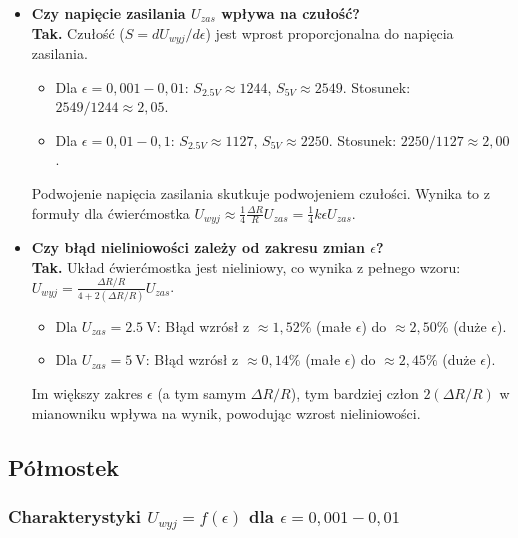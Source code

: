 \documentclass[12pt, a4paper]{article}
\begin{document}
	\begin{itemize}
		\item \textbf{Czy napięcie zasilania $U_{zas}$ wpływa na czułość?} \\
		\textbf{Tak.} Czułość ($S = dU_{wyj}/d\epsilon$) jest wprost proporcjonalna do napięcia zasilania.
		\begin{itemize}
			\item Dla $\epsilon=0,001-0,01$: $S_{2.5V} \approx 1244$, $S_{5V} \approx 2549$. Stosunek: $2549 / 1244 \approx 2,05$.
			\item Dla $\epsilon=0,01-0,1$: $S_{2.5V} \approx 1127$, $S_{5V} \approx 2250$. Stosunek: $2250 / 1127 \approx 2,00$.
		\end{itemize}
		Podwojenie napięcia zasilania skutkuje podwojeniem czułości. Wynika to z formuły dla ćwierćmostka $U_{wyj} \approx \frac{1}{4} \frac{\Delta R}{R} U_{zas} = \frac{1}{4} k \epsilon U_{zas}$.
		
		\item \textbf{Czy błąd nieliniowości zależy od zakresu zmian $\epsilon$?} \\
		\textbf{Tak.} Układ ćwierćmostka jest nieliniowy, co wynika z pełnego wzoru: $U_{wyj} = \frac{\Delta R/R}{4+2(\Delta R/R)} U_{zas}$.
		\begin{itemize}
			\item Dla $U_{zas} = \SI{2.5}{\volt}$: Błąd wzrósł z $\approx 1,52 \%$ (małe $\epsilon$) do $\approx 2,50 \%$ (duże $\epsilon$).
			\item Dla $U_{zas} = \SI{5}{\volt}$: Błąd wzrósł z $\approx 0,14 \%$ (małe $\epsilon$) do $\approx 2,45 \%$ (duże $\epsilon$).
		\end{itemize}
		Im większy zakres $\epsilon$ (a tym samym $\Delta R/R$), tym bardziej człon $2(\Delta R/R)$ w mianowniku wpływa na wynik, powodując wzrost nieliniowości.
	\end{itemize}
	
	\subsection{Półmostek}
	
	\subsubsection{Charakterystyki $U_{wyj} = f(\epsilon)$ dla $\epsilon = 0,001-0,01$}
	
\end{document}
